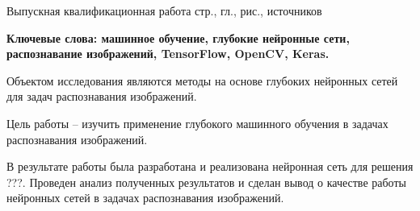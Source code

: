 
Выпускная квалификационная работа \pageref{LastPage} стр., 
 гл., 
\totalfigures рис.,
 источников

\textbf{Ключевые слова: машинное обучение, глубокие нейронные сети, распознавание изображений, TensorFlow, OpenCV, Keras.}

Объектом исследования являются методы на основе глубоких нейронных сетей для задач распознавания изображений. 

Цель работы – изучить применение глубокого машинного обучения в задачах распознавания изображений.

В результате работы была разработана и реализована нейронная сеть для решения ???. Проведен анализ полученных результатов и сделан вывод о качестве работы нейронных сетей в задачах распознавания изображений.

\clearpage